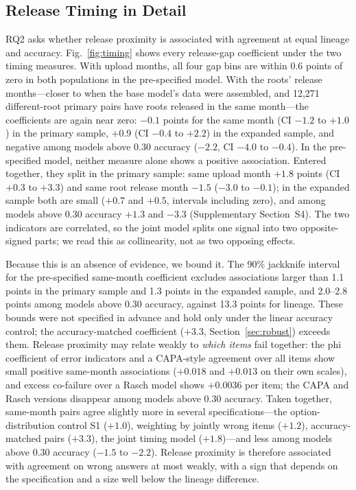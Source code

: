 \documentclass{ieeeaccess}
\theoremstyle{definition}
\theoremstyle{plain}
\begin{document}
\subsection{Release Timing in Detail}
\label{sec:timing}
RQ2 asks whether release proximity is associated with agreement at equal lineage and accuracy. Fig.~\ref{fig:timing} shows every release-gap coefficient under the two timing measures. With upload months, all four gap bins are within 0.6 points of zero in both populations in the pre-specified model. With the roots' release months---closer to when the base model's data were assembled, and 12{,}271 different-root primary pairs have roots released in the same month---the coefficients are again near zero: $-0.1$ points for the same month (CI $-1.2$ to $+1.0$) in the primary sample, $+0.9$ (CI $-0.4$ to $+2.2$) in the expanded sample, and negative among models above 0.30 accuracy ($-2.2$, CI $-4.0$ to $-0.4$). In the pre-specified model, neither measure alone shows a positive association. Entered together, they split in the primary sample: same upload month $+1.8$ points (CI $+0.3$ to $+3.3$) and same root release month $-1.5$ ($-3.0$ to $-0.1$); in the expanded sample both are small ($+0.7$ and $+0.5$, intervals including zero), and among models above 0.30 accuracy $+1.3$ and $-3.3$ (Supplementary Section~S4). The two indicators are correlated, so the joint model splits one signal into two opposite-signed parts; we read this as collinearity, not as two opposing effects.

Because this is an absence of evidence, we bound it. The 90\% jackknife interval for the pre-specified same-month coefficient excludes associations larger than 1.1 points in the primary sample and 1.3 points in the expanded sample, and 2.0--2.8 points among models above 0.30 accuracy, against 13.3 points for lineage. These bounds were not specified in advance and hold only under the linear accuracy control; the accuracy-matched coefficient ($+3.3$, Section~\ref{sec:robust}) exceeds them. Release proximity may relate weakly to \emph{which items} fail together: the phi coefficient of error indicators and a CAPA-style agreement over all items show small positive same-month associations ($+0.018$ and $+0.013$ on their own scales), and excess co-failure over a Rasch model shows $+0.0036$ per item; the CAPA and Rasch versions disappear among models above 0.30 accuracy. Taken together, same-month pairs agree slightly more in several specifications---the option-distribution control S1 ($+1.0$), weighting by jointly wrong items ($+1.2$), accuracy-matched pairs ($+3.3$), the joint timing model ($+1.8$)---and less among models above 0.30 accuracy ($-1.5$ to $-2.2$). Release proximity is therefore associated with agreement on wrong answers at most weakly, with a sign that depends on the specification and a size well below the lineage difference.
\end{document}
